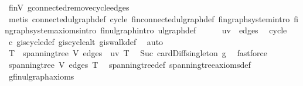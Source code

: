 \begin{isabellebody}
\ finV\ g{\isachardot}{\kern0pt}connected{\isacharunderscore}{\kern0pt}remove{\isacharunderscore}{\kern0pt}cycle{\isacharunderscore}{\kern0pt}edges\isanewline
\ \ \ \ \ \ \isamarkupfalse%
\ {\isacharparenleft}{\kern0pt}metis\ connected{\isacharunderscore}{\kern0pt}ulgraph{\isacharunderscore}{\kern0pt}def\ cycle\ fin{\isacharunderscore}{\kern0pt}connected{\isacharunderscore}{\kern0pt}ulgraph{\isacharunderscore}{\kern0pt}def\ fin{\isacharunderscore}{\kern0pt}graph{\isacharunderscore}{\kern0pt}system{\isachardot}{\kern0pt}intro\ fin{\isacharunderscore}{\kern0pt}graph{\isacharunderscore}{\kern0pt}system{\isacharunderscore}{\kern0pt}axioms{\isachardot}{\kern0pt}intro\ fin{\isacharunderscore}{\kern0pt}ulgraph{\isachardot}{\kern0pt}intro\ ulgraph{\isacharunderscore}{\kern0pt}def{\isacharparenright}{\kern0pt}\isanewline
\ \ \ \ \isamarkupfalse%
\ {\isachardoublequoteopen}{\isacharbraceleft}{\kern0pt}u{\isacharcomma}{\kern0pt}v{\isacharbraceright}{\kern0pt}\ {\isasymin}\ edges{\isachardoublequoteclose}\ \isamarkupfalse%
\ cycle\ \isamarkupfalse%
\ c\ g{\isachardot}{\kern0pt}is{\isacharunderscore}{\kern0pt}cycle{}{\isacharunderscore}{\kern0pt}def\ g{\isachardot}{\kern0pt}is{\isacharunderscore}{\kern0pt}cycle{\isacharunderscore}{\kern0pt}alt\ g{\isachardot}{\kern0pt}is{\isacharunderscore}{\kern0pt}walk{\isacharunderscore}{\kern0pt}def\ \isamarkupfalse%
\ auto\isanewline
\ \ \ \ \isamarkupfalse%
\ \isamarkupfalse%
\ T\ \ {\isachardoublequoteopen}spanning{\isacharunderscore}{\kern0pt}tree\ V\ {\isacharparenleft}{\kern0pt}edges\ {\isacharminus}{\kern0pt}\ {\isacharbraceleft}{\kern0pt}{\isacharbraceleft}{\kern0pt}u{\isacharcomma}{\kern0pt}v{\isacharbraceright}{\kern0pt}{\isacharbraceright}{\kern0pt}{\isacharparenright}{\kern0pt}\ T{\isachardoublequoteclose}\ \isamarkupfalse%
\ Suc\ card{\isacharunderscore}{\kern0pt}Diff{\isacharunderscore}{\kern0pt}singleton\ g{\isacharprime}{\kern0pt}\ \isamarkupfalse%
\ fastforce\isanewline
\ \ \ \ \isamarkupfalse%
\ \isamarkupfalse%
\ {\isachardoublequoteopen}spanning{\isacharunderscore}{\kern0pt}tree\ V\ edges\ T{\isachardoublequoteclose}\ \isamarkupfalse%
\ spanning{\isacharunderscore}{\kern0pt}tree{\isacharunderscore}{\kern0pt}def\ spanning{\isacharunderscore}{\kern0pt}tree{\isacharunderscore}{\kern0pt}axioms{\isacharunderscore}{\kern0pt}def\ \isamarkupfalse%
\ g{\isachardot}{\kern0pt}fin{\isacharunderscore}{\kern0pt}ulgraph{\isacharunderscore}{\kern0pt}axioms\ \isamarkupfalse%

\end{isabellebody}
